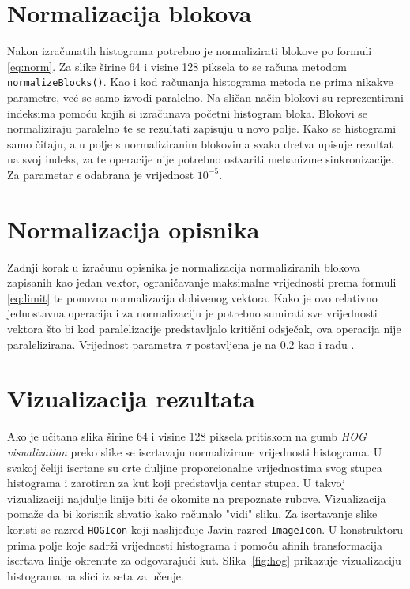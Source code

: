 \documentclass[times, utf8, zavrsni]{fer}
\begin{document}
\section{Normalizacija blokova}
Nakon izračunatih histograma potrebno je normalizirati blokove po formuli \ref{eq:norm}. Za slike širine 64 i visine 128 piksela to se računa metodom \verb|normalizeBlocks()|. Kao i kod računanja histograma metoda ne prima nikakve parametre, već se samo izvodi paralelno. Na sličan način blokovi su reprezentirani indeksima pomoću kojih si izračunava početni histogram bloka. Blokovi se normaliziraju paralelno te se rezultati zapisuju u novo polje. Kako se histogrami samo čitaju, a u polje s normaliziranim blokovima svaka dretva upisuje rezultat na svoj indeks, za te operacije nije potrebno ostvariti mehanizme sinkronizacije. Za parametar $\epsilon$ odabrana je vrijednost \(10^{-5}\).

\section{Normalizacija opisnika}
Zadnji korak u izračunu opisnika je normalizacija normaliziranih blokova zapisanih kao jedan vektor, ograničavanje maksimalne vrijednosti prema formuli \ref{eq:limit} te ponovna normalizacija dobivenog vektora. Kako je ovo relativno jednostavna operacija i za normalizaciju je potrebno sumirati sve vrijednosti vektora što bi kod paralelizacije predstavljalo kritični odsječak, ova operacija nije paralelizirana. Vrijednost parametra $\tau$ postavljena je na \(0.2\) kao i radu \cite{tomasi2012histograms}.

\section{Vizualizacija rezultata}
Ako je učitana slika širine 64 i visine 128 piksela pritiskom na gumb \textit{HOG visualization} preko slike se iscrtavaju normalizirane vrijednosti histograma. U svakoj čeliji iscrtane su crte duljine proporcionalne vrijednostima svog stupca histograma i zarotiran za kut koji predstavlja centar stupca. U takvoj vizualizaciji najdulje linije biti će okomite na prepoznate rubove. Vizualizacija pomaže da bi korisnik shvatio kako računalo "vidi" sliku. Za iscrtavanje slike koristi se razred \verb|HOGIcon| koji naslijeđuje Javin razred \verb|ImageIcon|. U konstruktoru prima polje koje sadrži vrijednosti histograma i pomoću afinih transformacija iscrtava linije okrenute za odgovarajući kut. Slika~\ref{fig:hog} prikazuje vizualizaciju histograma na slici iz seta za učenje.
\end{document}
